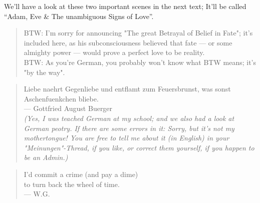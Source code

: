 We'll have a look at these two important scenes in the next text; It'll be called \enquote{Adam, Eve \& The unambiguous Signs of Love}.

\begin{quote}
BTW: I'm sorry for announcing "The great Betrayal of Belief in Fate"; it's included here, as his subconsciousness believed that fate --- or some almighty power --- would prove a perfect love to be reality.\\
BTW: As you're German, you probably won't know what BTW means; it's "by the way". 
\end{quote}

\begin{verse}
Liebe naehrt Gegenliebe und entflamt zum Feuersbrunst, was sonst Aschenfuenkchen bliebe.\\
--- Gottfried August Buerger\\
\emph{(Yes, I was teached German at my school; and we also had a look at German peotry. If there are some errors in it: Sorry, but it's not my mothertongue! You are free to tell me about it (in English) in your "Meinungen"-Thread, if you like, or correct them yourself, if you happen to be an Admin.)}  
\end{verse}

\begin{verse}
I'd commit a crime (and pay a dime)\\
to turn back the wheel of time.\\
--- W.G.  
\end{verse}

